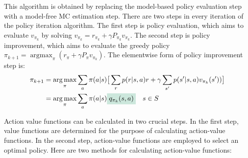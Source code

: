   This algorithm is obtained by replacing the model-based policy evaluation step with a model-free MC estimation step. There are two steps in every iteration
  of the policy iteration algorithm. The first step is policy evaluation, which aims to evaluate $v_{\pi_{k}}$ by solving $v_{\pi_{k}}=r_{\pi_{k}}+\gamma
    P_{\pi_{k}}v_{\pi_{k}}$. The second step is policy improvement, which aims to evaluate the greedy policy $\pi_{k+1} = \mathop{\arg
      \max}_{\pi}(r_{\pi}+\gamma P_{\pi}v_{\pi_{k}})$. The elementwise form of policy improvement step is:
  \begin{align*}
    \pi_{k+1} & = \mathop{\arg \max}_{\pi} \sum_{a} \pi(a|s)\big[ \sum_{r}p(r|s,a)r + \gamma \sum_{s'}p(s'|s,a)v_{\pi_{k}}(s')) \big] \\
              & = \mathop{\arg \max}_{\pi}\sum_{a} \pi(a|s) \colorbox{mygreen!20!white}{$q_{\pi_{k}}(s,a)$} \quad s \in S
  \end{align*}

  Action value functions can be calculated in two crucial steps. In the first step, value functions are determined for the purpose of calculating action-value
  functions. In the second step, action-value functions are employed to select an optimal policy. Here are two methods for calculating action-value functions:

